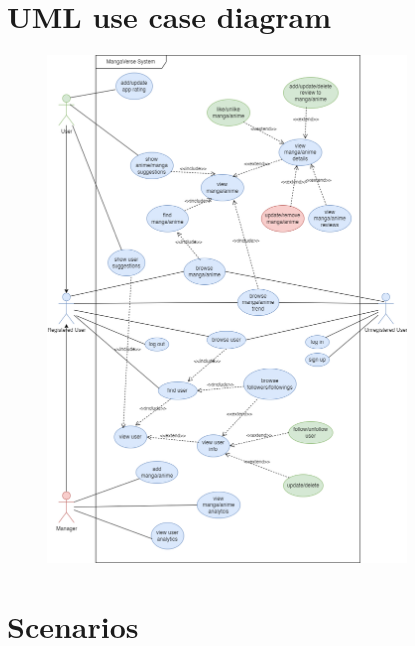 \newpage

\section{UML use case diagram}

\begin{figure}[h]\label{uml use case diagram}
    \centering
    \includegraphics[width=0.85\textwidth]{Media/useCase.png}
\end{figure}

\newpage

\section{Scenarios}

\renewcommand{\arraystretch}{1.5}
\setlength{\arrayrulewidth}{1pt} %

